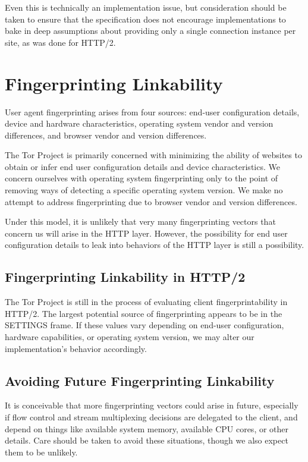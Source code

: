\documentclass[letterpaper,11pt]{llncs}
\begin{document}
Even this is technically an implementation issue, but consideration should be
taken to ensure that the specification does not encourage implementations to
bake in deep assumptions about providing only a single connection instance per
site, as was done for HTTP/2.

\section{Fingerprinting Linkability}

User agent fingerprinting arises from four sources: end-user configuration
details, device and hardware characteristics, operating system vendor and
version differences, and browser vendor and version differences.

The Tor Project is primarily concerned with minimizing the ability of websites
to obtain or infer end user configuration details and device characteristics.
We concern ourselves with operating system fingerprinting only to the point of
removing ways of detecting a specific operating system version. We make no
attempt to address fingerprinting due to browser vendor and version
differences. %

Under this model, it is unlikely that very many fingerprinting vectors that
concern us will arise in the HTTP layer. However, the possibility for end user
configuration details to leak into behaviors of the HTTP layer is still a
possibility.

\subsection{Fingerprinting Linkability in HTTP/2}

The Tor Project is still in the process of evaluating client
fingerprintability in HTTP/2. The largest potential source of fingerprinting
appears to be in the SETTINGS frame. If these values vary depending on end-user
configuration, hardware capabilities, or operating system version, we may
alter our implementation's behavior accordingly.

\subsection{Avoiding Future Fingerprinting Linkability}

It is conceivable that more fingerprinting vectors could arise in future,
especially if flow control and stream multiplexing decisions are delegated to
the client, and depend on things like available system memory, available CPU
cores, or other details. Care should be taken to avoid these situations,
though we also expect them to be unlikely.
\end{document}

